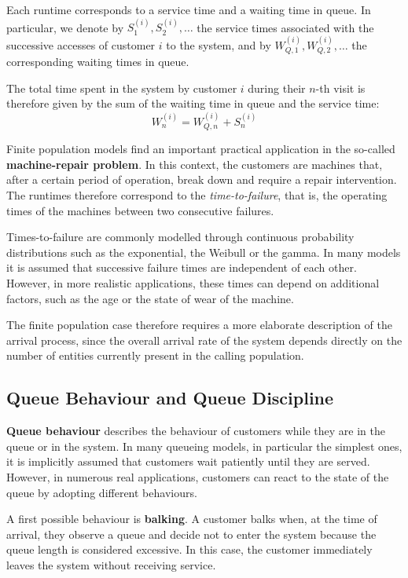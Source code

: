 Each runtime corresponds to a service time and a waiting time in queue. In particular, we denote by $S_1^{(i)}, S_2^{(i)}, \dots$ the service times associated with the successive accesses of customer $i$ to the system, and by $W_{Q,1}^{(i)}, W_{Q,2}^{(i)}, \dots$ the corresponding waiting times in queue.

The total time spent in the system by customer $i$ during their $n$-th visit is therefore given by the sum of the waiting time in queue and the service time:
\[
W_n^{(i)} = W_{Q,n}^{(i)} + S_n^{(i)}
\]

Finite population models find an important practical application in the so-called \textbf{machine-repair problem}. In this context, the customers are machines that, after a certain period of operation, break down and require a repair intervention. The runtimes therefore correspond to the \emph{time-to-failure}, that is, the operating times of the machines between two consecutive failures.

Times-to-failure are commonly modelled through continuous probability distributions such as the exponential, the Weibull or the gamma. In many models it is assumed that successive failure times are independent of each other. However, in more realistic applications, these times can depend on additional factors, such as the age or the state of wear of the machine.

The finite population case therefore requires a more elaborate description of the arrival process, since the overall arrival rate of the system depends directly on the number of entities currently present in the calling population.

\subsection{Queue Behaviour and Queue Discipline}

\textbf{Queue behaviour} describes the behaviour of customers while they are in the queue or in the system. In many queueing models, in particular the simplest ones, it is implicitly assumed that customers wait patiently until they are served. However, in numerous real applications, customers can react to the state of the queue by adopting different behaviours.

A first possible behaviour is \textbf{balking}. A customer balks when, at the time of arrival, they observe a queue and decide not to enter the system because the queue length is considered excessive. In this case, the customer immediately leaves the system without receiving service.

